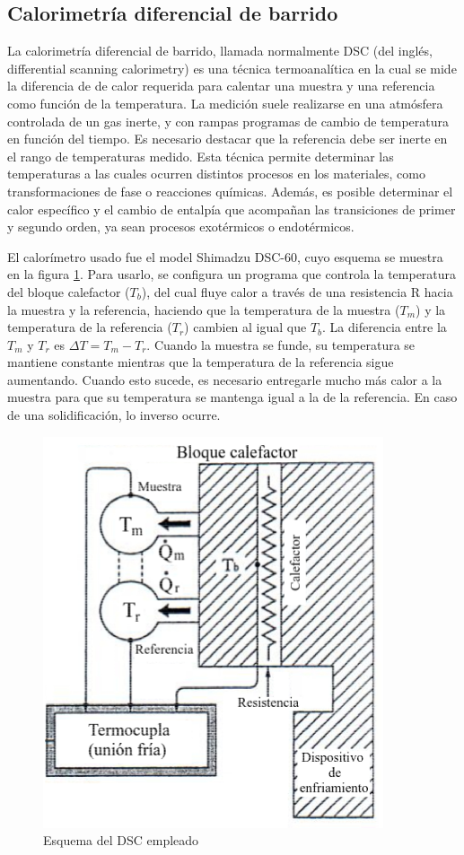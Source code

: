 \documentclass[12pt]{article}
\theoremstyle{definition}
\theoremstyle{remark}
\begin{document}
{\subsection{Calorimetría diferencial de barrido}

La calorimetría diferencial de barrido, llamada normalmente DSC (del inglés, differential scanning calorimetry) es una técnica termoanalítica en la cual se mide la diferencia de de calor requerida para calentar una muestra y una referencia como función de la temperatura. La medición suele realizarse en una atmósfera controlada de un gas inerte, y con rampas programas de cambio de temperatura en función del tiempo.  Es necesario destacar que la referencia debe ser inerte en el rango de temperaturas medido.
Esta técnica permite determinar las temperaturas a las cuales ocurren distintos procesos en los materiales, como transformaciones de fase o reacciones químicas. Además, es posible determinar el calor específico y el cambio de entalpía que acompañan las transiciones de primer y segundo orden, ya sean procesos exotérmicos o endotérmicos.

El calorímetro usado fue el model Shimadzu DSC-60, cuyo esquema se muestra en la figura \ref{DSCscheme}. Para usarlo, se configura un programa que controla la temperatura del bloque calefactor ($T_b$), del cual fluye calor a través de una resistencia R hacia la muestra y la referencia, haciendo que la temperatura de la muestra ($T_m$) y la temperatura de la referencia ($T_r$) cambien al igual que $T_b$. La diferencia entre la $T_m$ y $T_r$ es $\Delta T = T_m - T_r$. Cuando la muestra se funde, su temperatura se mantiene constante mientras que la temperatura de la referencia sigue aumentando. Cuando esto sucede, es necesario entregarle mucho más calor a la muestra para que su temperatura se mantenga igual a la de la referencia. En caso de una solidificación, lo inverso ocurre.

\begin{figure}[h]
	\centering
	\includegraphics[scale=0.5]{img/DSCscheme.png}
	\caption{Esquema del DSC empleado}
	\label{DSCscheme}
\end{figure}

}
\end{document}
